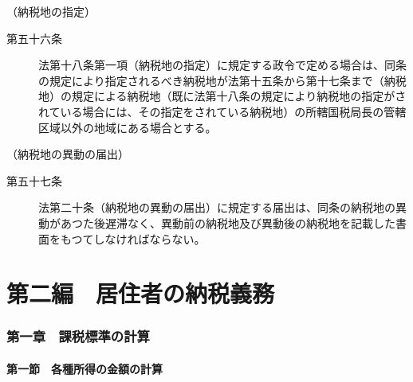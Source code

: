 \documentclass[twocolumn,a4j,10pt]{ltjtarticle}
\begin{document}
\noindent\hspace{10pt}（納税地の指定）
\begin{description}
\item[第五十六条]法第十八条第一項（納税地の指定）に規定する政令で定める場合は、同条の規定により指定されるべき納税地が法第十五条から第十七条まで（納税地）の規定による納税地（既に法第十八条の規定により納税地の指定がされている場合には、その指定をされている納税地）の所轄国税局長の管轄区域以外の地域にある場合とする。
\end{description}
\noindent\hspace{10pt}（納税地の異動の届出）
\begin{description}
\item[第五十七条]法第二十条（納税地の異動の届出）に規定する届出は、同条の納税地の異動があつた後遅滞なく、異動前の納税地及び異動後の納税地を記載した書面をもつてしなければならない。
\end{description}
\part*{第二編　居住者の納税義務}
\section*{第一章　課税標準の計算}
\subsection*{第一節　各種所得の金額の計算}
\end{document}
